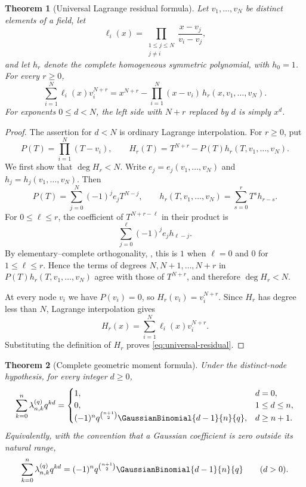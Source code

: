 \documentclass[11pt,a4paper,oneside,openany]{book}
\newtheorem{theorem}{Theorem}[chapter]
\theoremstyle{definition}
\theoremstyle{remark}
\begin{document}
\begin{theorem}[Universal Lagrange residual formula]\label{thm:universal-lagrange-residual}
Let $v_1,\ldots,v_N$ be distinct elements of a field, let
\[
 \ell_i(x)=\prod_{\substack{1\le j\le N\\j\ne i}}
 \frac{x-v_j}{v_i-v_j},
\]
and let $h_r$ denote the complete homogeneous symmetric polynomial, with $h_0=1$.  For every $r\ge0$,
\begin{equation}\label{eq:universal-residual}
 \sum_{i=1}^{N}\ell_i(x)v_i^{N+r}
 =x^{N+r}-\prod_{i=1}^{N}(x-v_i)\,
 h_r(x,v_1,\ldots,v_N).
\end{equation}
For exponents $0\le d<N$, the left side with $N+r$ replaced by $d$ is simply $x^d$.
\end{theorem}

\begin{proof}
The assertion for $d<N$ is ordinary Lagrange interpolation.  For $r\ge0$, put
\[
 P(T)=\prod_{i=1}^{N}(T-v_i),
 \qquad
 H_r(T)=T^{N+r}-P(T)h_r(T,v_1,\ldots,v_N).
\]
We first show that $\deg H_r<N$.  Write $e_j=e_j(v_1,\ldots,v_N)$ and
$h_j=h_j(v_1,\ldots,v_N)$.  Then
\[
 P(T)=\sum_{j=0}^{N}(-1)^je_jT^{N-j},
 \qquad
 h_r(T,v_1,\ldots,v_N)=\sum_{s=0}^{r}T^s h_{r-s}.
\]
For $0\le \ell\le r$, the coefficient of $T^{N+r-\ell}$ in their product is
\[
 \sum_{j=0}^{\ell}(-1)^je_jh_{\ell-j}.
\]
By elementary--complete orthogonality, , this is $1$ when $\ell=0$ and $0$ for $1\le\ell\le r$.  Hence the terms of degrees $N,N+1,\ldots,N+r$ in $P(T)h_r(T,v_1,\ldots,v_N)$ agree with those of $T^{N+r}$, and therefore $\deg H_r<N$.

At every node $v_i$ we have $P(v_i)=0$, so
$H_r(v_i)=v_i^{N+r}$.  Since $H_r$ has degree less than $N$, Lagrange interpolation gives
\[
 H_r(x)=\sum_{i=1}^{N}\ell_i(x)v_i^{N+r}.
\]
Substituting the definition of $H_r$ proves \eqref{eq:universal-residual}.
\end{proof}

\begin{theorem}[Complete geometric moment formula]\label{thm:complete-geometric-moments}
Under the distinct-node hypothesis, for every integer $d\ge0$,
\begin{equation}\label{eq:complete-geometric-moments}
 \sum_{k=0}^{n}\lambda_{n,k}^{(q)}q^{kd}
 =
 \begin{cases}
  1,&d=0,\\
  0,&1\le d\le n,\\
  (-1)^nq^{\binom{n+1}{2}}\GaussianBinomial{d-1}{n}{q},&d\ge n+1.
 \end{cases}
\end{equation}
Equivalently, with the convention that a Gaussian coefficient is zero outside its natural range,
\begin{equation}\label{eq:complete-geometric-moments-compact}
 \sum_{k=0}^{n}\lambda_{n,k}^{(q)}q^{kd}
 =(-1)^nq^{\binom{n+1}{2}}\GaussianBinomial{d-1}{n}{q}
 \qquad(d>0).
\end{equation}
\end{theorem}
\end{document}
